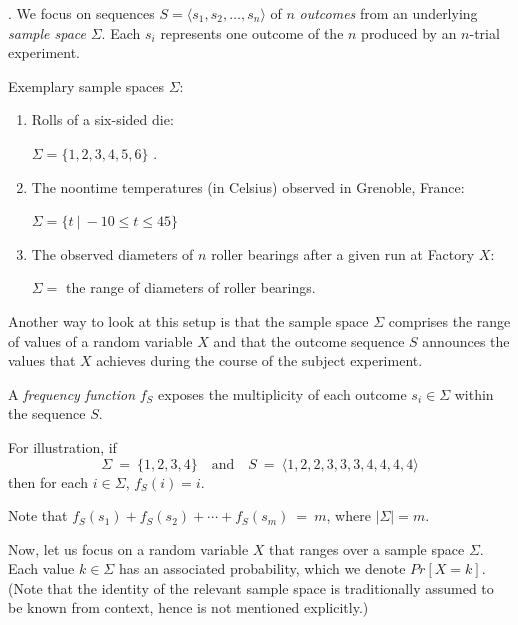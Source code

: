 \medskip

.
We focus on sequences $S = \langle s_1, s_2, \ldots, s_n \rangle$ of $n$ {\it outcomes} from an underlying {\it sample space} $\Sigma$.  Each $s_i$ represents one outcome of the $n$ produced by an $n$-trial experiment.

\smallskip

Exemplary sample spaces $\Sigma$:
  \begin{enumerate}
  \item
Rolls of a six-sided die:

$\Sigma = \{1, 2, 3, 4, 5, 6\}$ .
  \medskip\item
The noontime temperatures (in Celsius) observed in Grenoble, France:

$\Sigma = \{ t \ | \ -10 \leq t \leq 45\}$
  \medskip\item
The observed diameters of $n$ roller bearings after a given run at Factory $X$:

$\Sigma =$ the range of diameters of roller bearings.
  \end{enumerate}

Another way to look at this setup is that the sample space $\Sigma$ comprises the range of values of a random variable $X$ and that the outcome sequence $S$ announces the values that $X$ achieves during the course of the subject experiment.

\medskip

A {\it frequency function} $f_S$ exposes the multiplicity of each outcome $s_i \in \Sigma$ within the sequence $S$.

\smallskip

For illustration, if 
\begin{equation}
\label{eq:sample-seq-10}
\Sigma \ = \  \{1, 2, 3, 4\} \ \ \ \mbox{ and } \ \ \
S \ = \ \langle 1, 2, 2, 3, 3, 3, 4, 4, 4, 4 \rangle
\end{equation}
then for each $i \in \Sigma$, $f_S(i) = i$.

\medskip

Note that $f_S(s_1) + f_S(s_2) + \cdots + f_S(s_m) \ = \ m$, where $|\Sigma| = m$.

\medskip


Now, let us focus on a random variable $X$ that ranges over a sample space $\Sigma$.  Each value $k \in \Sigma$ has an associated probability, which we denote $Pr[X=k]$.  (Note that the identity of the relevant sample space is traditionally assumed to be known from context, hence is not mentioned explicitly.)

